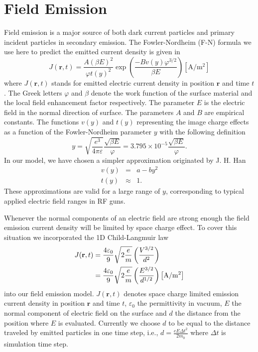 

\chapter{Field Emission}
\label{chp:femiss}
Field emission is a major source of both dark current particles and primary
incident particles in secondary emission. The Fowler-Nordheim (F-N) formula
we use here to predict the emitted current density is given in 
\cite{BC} \cite{FN}
%
\begin{equation}\label{eq:units}
    J(\mathbf{r},t) = \frac{A(\beta E)^2}{\varphi t(y)^2}
                      \exp{\left(\frac{-B v(y)\varphi^{3/2}}{\beta E}\right)}
                      \left[\mathrm{A/m^2}\right]
\end{equation}
%
where $J(\mathbf{r},t)$ stands for emitted electric current density in position
$\mathbf{r}$ and time $t$. The Greek letters $\varphi$ and $\beta$ denote the
work function of the surface material and the local field enhancement factor
respectively. The parameter $E$ is the electric field in the normal direction
of surface. The parameters $A$ and $B$ are empirical constants. The functions
$v(y)$ and $t(y)$ representing the image charge effects \cite{BC} as a function
of the Fowler-Nordheim parameter $y$ with the following definition\cite{DE}
%
\begin{equation}\label{eq:imagecharge}
    y = \sqrt{\frac{e^3}{4\pi\varepsilon}}\frac{\sqrt{\beta E}}{\varphi}
      = 3.795\times10^{-5}\frac{\sqrt{\beta E}}{\varphi} \text{.}
\end{equation}
%
In our model, we have chosen a simpler approximation originated by J. H. Han\cite{DE}
\begin{eqnarray*}
v(y) &=& a-by^2 \\
t(y) &\approx& 1 \text{.}
\end{eqnarray*}
These approximations are valid for a large range of $y$, corresponding to
typical applied electric field ranges in RF guns.

Whenever the normal components of an electric field are strong enough the field
emission current density will be limited by space charge effect\cite{BC}.
To cover this situation we incorporated the 1D Child-Langmuir law
%
\begin{align}\label{eq:SpaceCharge}
    J(\mathbf{r},t) & =\frac{4\varepsilon_0}{9}\sqrt{2\frac{e}{m}}\left(\frac{V^{3/2}}{d^2}\right)\notag\\
    &
    =\frac{4\varepsilon_0}{9}\sqrt{2\frac{e}{m}}\left(\frac{E^{3/2}}{d^{1/2}}\right)
    \left[\mathrm{A/m^2}\right]
\end{align}
%
into our field emission model. $J(\mathbf{r},t)$ denotes space charge limited emission
current density in position $\mathbf{r}$ and time $t$, $\varepsilon_0$ the
permittivity in vacuum, $E$ the normal component of electric field on the surface
and $d$ the distance from the position where $E$ is evaluated. Currently we
choose $d$ to be equal to the distance traveled by emitted particles in one
time step, i.e., $d=\frac{\displaystyle eE\Delta{t}^2}{\displaystyle 2m_0}$ where $\Delta{t}$ is simulation
time step.

